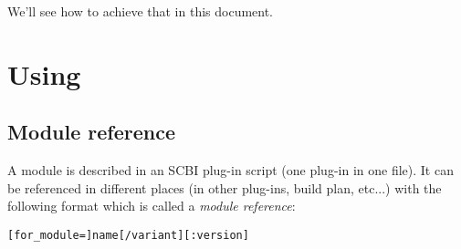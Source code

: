 \documentclass[a4paper,12pt,twoside]{article}
\newcommand{\code}[1]{\texttt{#1}}
\renewcommand{\emph}[1]{\textit{#1}}
\let\stdsection\section
\renewcommand\section{\newpage\stdsection}
\begin{document}
We'll see how to achieve that in this document.


\section{Using}

\subsection{Module reference}
\label{modref}

A module is described in an SCBI plug-in script (one plug-in in one file). It can be referenced in different places (in other plug-ins, build plan, etc...) with the following format which is called a \emph{module reference}:

\code{[for\_module=]name[/variant][:version]}
\label{dev}
\end{document}
